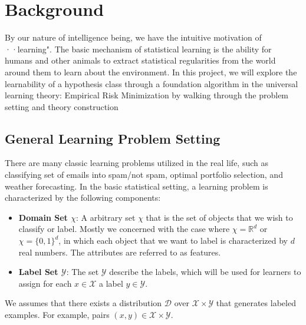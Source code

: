 

\newtheorem{definition}{Definition}
\newtheorem{lemma}{Lemma}

\section{Background}

By our nature of intelligence being, we have the intuitive motivation of ··learning". The basic mechanism of statistical learning is the ability for humans and other animals to extract statistical regularities from the world around them to learn about the environment. In this project, we will explore the learnability of a hypothesis class through a foundation algorithm in the universal learning theory: Empirical Risk Minimization by walking through the problem setting and theory construction\\

\subsection{General Learning Problem Setting}
There are many classic learning problems utilized in the real life, such as classifying set of emails into spam/not spam, optimal portfolio selection, and weather forecasting. In the basic statistical setting, a learning problem is characterized by the following components: 
\begin{itemize} 
    \item \textbf{Domain Set $\chi$}: A arbitrary set $\chi$ that is the set of objects that we wish to classify or label. Mostly we concerned with the case where $\chi = \mathbb{R}^{d}$ or $\chi = \{0,1\}^{d}$, in which each object that we want to label is characterized by $d$ real numbers. The attributes are referred to as features.
    \item \textbf{Label Set $\mathcal{Y}$}: The set $\mathcal{Y}$ describe the labels, which will be used for learners to assign for each $x \in \mathcal{X}$ a label $y \in \mathcal{Y}$.
\end{itemize}
We assumes that there exists a distribution $\mathcal{D}$ over $\mathcal{X} \times \mathcal{Y}$ that generates labeled examples. For example, pairs $(x,y) \in \mathcal{X} \times \mathcal{Y}$.\\

